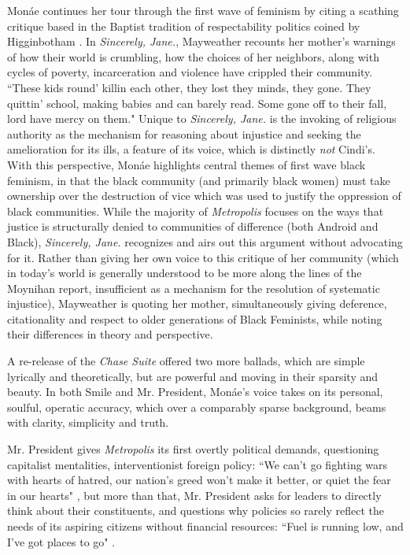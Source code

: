 \documentclass[a4paper, 11pt]{article} %
\begin{document}
Mon\'ae continues her tour through the first wave of feminism by citing a scathing critique based in the Baptist tradition of respectability politics coined by Higginbotham \cite{higginbotham}.
In \emph{Sincerely, Jane.}, Mayweather recounts her mother's warnings of how their world is crumbling, how the choices of her neighbors, along with cycles of poverty, incarceration and violence have crippled their community.
``These kids round' killin each other, they lost they minds, they gone. They quittin' school, making babies and can barely read. Some gone off to their fall, lord have mercy on them." \cite{sincerelyjane}
Unique to \emph{Sincerely, Jane.} is the invoking of religious authority as the mechanism for reasoning about injustice and seeking the amelioration for its ills, a feature of its voice, which is distinctly \emph{not} Cindi's.
With this perspective, Mon\'ae highlights central themes of first wave black feminism, in that the black community (and primarily black women) must take ownership over the destruction of vice which was used to justify the oppression of black communities. 
While the majority of \emph{Metropolis} focuses on the ways that justice is structurally denied to communities of difference (both Android and Black), \emph{Sincerely, Jane.} recognizes and airs out this argument without advocating for it.
Rather than giving her own voice to this critique of her community (which in today's world is generally understood to be more along the lines of the Moynihan report, insufficient as a mechanism for the resolution of systematic injustice), Mayweather is quoting her mother, simultaneously giving deference, citationality and respect to older generations of Black Feminists, while noting their differences in theory and perspective.

A re-release of the \emph{Chase Suite} offered two more ballads, which are simple lyrically and theoretically, but are powerful and moving in their sparsity and beauty.
In both Smile and Mr. President, Mon\'ae's voice takes on its personal, soulful, operatic accuracy, which over a comparably sparse background, beams with clarity, simplicity and truth.

Mr. President gives \emph{Metropolis} its first overtly political demands, questioning capitalist mentalities, interventionist foreign policy: 
``We can't go fighting wars with hearts of hatred, our nation's greed won't make it better, or quiet the fear in our hearts" \cite{mrpresident},
but more than that, Mr. President asks for leaders to directly think about their constituents, and questions why policies so rarely reflect the needs of its aspiring citizens without financial resources:
``Fuel is running low, and I've got places to go" \cite{mrpresident}.
\end{document}
